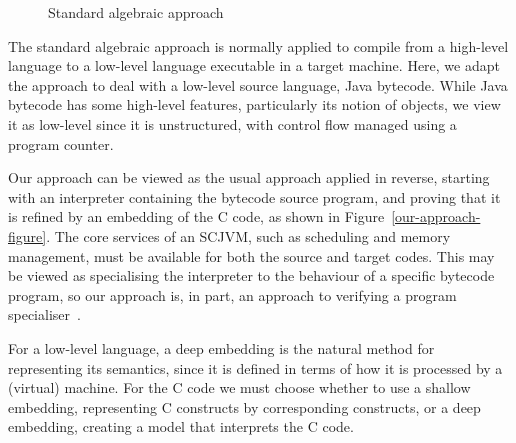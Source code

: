 \begin{figure}
  \centering
  \caption{Standard algebraic approach}
  \label{algebraic-approach-figure}
\end{figure}

The standard algebraic approach is normally applied to compile from a
high-level language to a low-level language executable in a target
machine.
Here, we adapt the approach to deal with a low-level source language,
Java bytecode.
While Java bytecode has some high-level features, particularly its
notion of objects, we view it as low-level since it is unstructured,
with control flow managed using a program counter.

Our approach can be viewed as the usual approach applied in reverse,
starting with an interpreter containing the bytecode source program,
and proving that it is refined by an embedding of the C code, as shown
in Figure~\ref{our-approach-figure}.
The core services of an SCJVM, such as scheduling and memory
management, must be available for both the source and target codes.
This may be viewed as specialising the interpreter to the behaviour of
a specific bytecode program, so our approach is, in part, an approach
to verifying a program specialiser~\cite{jones1993}.

For a low-level language, a deep embedding is the
natural method for representing its semantics, since it is defined in
terms of how it is processed by a (virtual) machine.
For the C code we must choose whether to use a shallow embedding,
representing C constructs by corresponding \Circus{} constructs, or a
deep embedding, creating a \Circus{} model that interprets the C
code.

